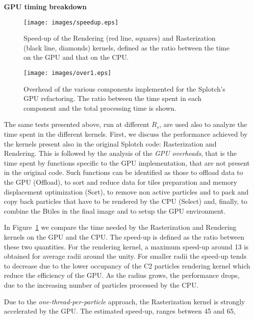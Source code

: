 \documentclass[1p]{elsarticle}
\begin{document}
\medskip
\noindent
{\bf GPU timing breakdown}

\begin{figure}
\centering
\texttt{[image: images/speedup.eps]}
\caption{
Speed-up of the Rendering (red line, squares) and Rasterization (black line, diamonds) kernels, defined as the ratio
between the time on the GPU and that on the CPU.
}
\label{fig:speedup}
\end{figure}

\begin{figure}
\centering
\texttt{[image: images/over1.eps]}
\caption{Overhead of the various components implemented for the Splotch's
GPU refactoring. The ratio between the time spent in each component and the total processing 
time is shown.}
\label{fig:over}
\end{figure}

\noindent
The same tests presented above, run at different $R_s$, are used also to
analyze the 
time spent in the different kernels. First, we discuss the performance 
achieved by the kernels present also in the original Splotch code: Rasterization and
Rendering.
This is followed by the analysis of the  
{\it GPU overheads}, that is the time spent by functions specific
to the GPU implementation, that are not present in the original code. Such functions can 
be identified as those to offload data to the GPU (Offload),
to sort and reduce data for tiles preparation and memory displacement optimization (Sort),
to remove non active particles and to pack and copy back particles that have to 
be rendered by the CPU (Select) and, finally,
to combine the Btiles in the final image and to setup the GPU environment.

In Figure~\ref{fig:speedup} we compare the time needed by the Rasterization and Rendering
kernels on the GPU and the CPU. The speed-up is defined as the ratio between these two
quantities. For the rendering kernel, a maximum speed-up around 13 is obtained for
average radii around the unity. For smaller radii the speed-up tends to decrease due 
to the lower occupancy of the C2 particles rendering kernel which reduce the efficiency of the GPU.
As the radius grows, the performance drops, due to the increasing number of particles
processed by the CPU.    

Due to the {\it one-thread-per-particle} approach, the Rasterization kernel is strongly
accelerated by the GPU. The estimated speed-up, ranges between 45 and 65, 
\end{document}
